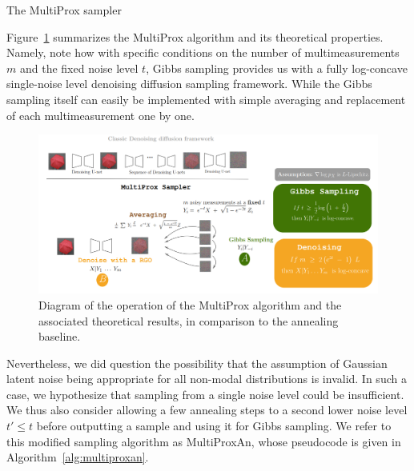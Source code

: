 \begin{algorithm}[H]
    \caption{The MultiProx sampler}
    \label{alg:multiprox}
    \begin{algorithmic}
        \ENDIF
        \ENDFOR
        \ENDFOR
    \end{algorithmic}
\end{algorithm}

Figure~\ref{fig:multiprox} summarizes the MultiProx algorithm and its theoretical properties. Namely, note how with specific conditions on the number of multimeasurements $m$ and the fixed noise level $t$, Gibbs sampling provides us with a fully log-concave single-noise level denoising diffusion sampling framework. While the Gibbs sampling itself can easily be implemented with simple averaging and replacement of each multimeasurement one by one.

\begin{figure}[H]
    \centering
    \includegraphics[width=\textwidth]{figures/multiprox/diagram.png}
    \caption[MultiProx diagram.]{Diagram of the operation of the MultiProx algorithm and the associated theoretical results, in comparison to the annealing baseline.}
    \label{fig:multiprox}
\end{figure}

Nevertheless, we did question the possibility that the assumption of Gaussian latent noise being appropriate for all non-modal distributions is invalid. In such a case, we hypothesize that sampling from a single noise level could be insufficient. We thus also consider allowing a few annealing steps to a second lower noise level $t' \leq t$ before outputting a sample and using it for Gibbs sampling. We refer to this modified sampling algorithm as MultiProxAn, whose pseudocode is given in Algorithm~\ref{alg:multiproxan}.

